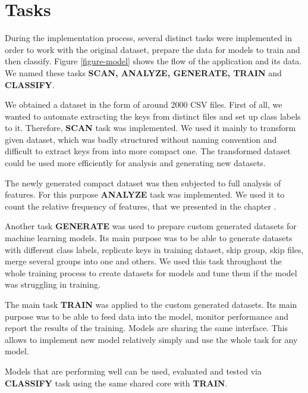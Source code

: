 \section{Tasks}

During the implementation process, several distinct tasks were implemented in order to work with the original dataset, prepare the data for models to train and then classify. Figure \ref{figure-model} shows the flow of the application and its data. We named these tasks \textbf{SCAN, ANALYZE, GENERATE, TRAIN} and \textbf{CLASSIFY}.

We obtained a dataset in the form of around 2000 CSV files. First of all, we wanted to automate extracting the keys from distinct files and set up class labels to it. Therefore, \textbf{SCAN} task was implemented. We used it mainly to transform given dataset, which was badly structured without naming convention and difficult to extract keys from into more compact one. The transformed dataset could be used more efficiently for analysis and generating new datasets.

The newly generated compact dataset was then subjected to full analysis of features. For this purpose \textbf{ANALYZE} task was implemented. We used it to count the relative frequency of features, that we presented in the chapter \label{chapter-analysis}.

Another task \textbf{GENERATE} was used to prepare custom generated datasets for machine learning models. Its main purpose was to be able to generate datasets with different class labels, replicate keys in training dataset, skip group, skip files, merge several groups into one and others. We used this task throughout the whole training process to create datasets for models and tune them if the model was struggling in training.

The main task \textbf{TRAIN} was applied to the custom generated datasets. Its main purpose was to be able to feed data into the model, monitor performance and report the results of the training. Models are sharing the same interface. This allows to implement new model relatively simply and use the whole task for any model.

Models that are performing well can be used, evaluated and tested via \textbf{CLASSIFY} task using the same shared core with \textbf{TRAIN}.

